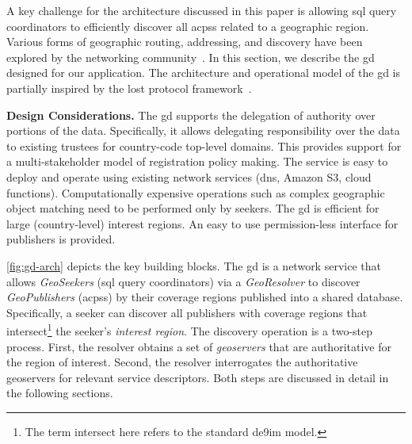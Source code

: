 \documentclass[conference,10pt]{IEEEtran}
\begin{document}

A key challenge for the architecture discussed in this paper is allowing \gls{sql} query coordinators to efficiently discover all \glspl{acps} related to a geographic region. Various forms of geographic routing, addressing, and discovery have been explored by the networking community~\cite{rfc1876,fioreze2011extending,meijerink2016efficient,dotgeo}. In this section, we describe the \gls{gd} designed for our application. The architecture and operational model of the \gls{gd} is partially inspired by the \gls{lost} protocol framework~\cite{rfc5582,rfc5222}.

\textbf{Design Considerations.} The \gls{gd} supports the delegation of authority over portions of the data. Specifically, it allows delegating responsibility over the data to existing trustees for country-code top-level domains. This provides support for a multi-stakeholder model of registration policy making. The service is easy to deploy and operate using existing network services (\gls{dns}, Amazon S3, cloud functions). Computationally expensive operations such as complex geographic object matching need to be performed only by seekers. The \gls{gd} is efficient for large (country-level) interest regions. An easy to use permission-less interface for publishers is provided.

\cref{fig:gd-arch} depicts the key building blocks. The \gls{gd} is a network service that allows \textit{GeoSeekers} (\gls{sql} query coordinators) via a \textit{GeoResolver} to discover \textit{GeoPublishers} (\glspl{acps}) by their coverage regions published into a shared database. Specifically, a seeker can discover all publishers with coverage regions that intersect\footnote{The term intersect here refers to the standard \gls{de9im} model.} the seeker's \textit{interest region}. The discovery operation is a two-step process. First, the resolver obtains a set of \textit{geoservers} that are authoritative for the region of interest. Second, the resolver interrogates the authoritative geoservers for relevant service descriptors. Both steps are discussed in detail in the following sections.
\end{document}
